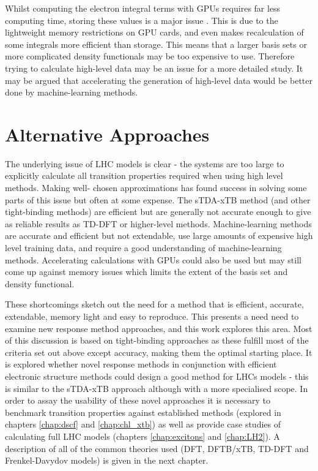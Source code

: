 Whilst computing the electron integral terms with GPUs requires far less computing 
time, storing these values is a major issue \cite{Sisto2014a}. This is due to the
lightweight memory restrictions on GPU cards, and even makes recalculation of some
integrals more efficient than storage. This means that a larger basis sets or more
complicated density functionals may be too expensive to use. Therefore trying to
calculate high-level data may be an issue for a more detailed study. It may be argued
that accelerating the generation of high-level data would be better done by machine-learning
methods.

\section{Alternative Approaches}
\label{sec:possible_novel_methods}

The underlying issue of LHC models is clear - the systems are too large to explicitly
calculate all transition properties required when using high level methods. Making
well- chosen approximations has found success in solving some parts of this issue
but often at some expense. The sTDA-xTB method (and other tight-binding methods) 
are efficient but are generally not accurate enough to give as reliable results 
as TD-DFT or higher-level methods. Machine-learning methods are accurate and efficient
but not extendable, use large amounts of expensive high level training data, and
require a good understanding of machine-learning methods. Accelerating calculations 
with GPUs could also be used but may still come up against memory issues which limits 
the extent of the basis set and density functional.

These shortcomings sketch out the need for a method that is efficient, accurate,
extendable, memory light and easy to reproduce. This presents a need need to examine
new response method approaches, and this work explores this area. Most of this discussion
is based on tight-binding approaches as these fulfill most of the criteria set out
above except accuracy, making them the optimal starting place. It is explored whether
novel response methods in conjunction with efficient electronic structure methods
could design a good method for LHCs models - this is similar to the sTDA-xTB approach
although with a more specialised scope. In order to assay the usability of these
novel approaches it is necessary to benchmark transition properties against established 
methods (explored in chapters \ref{chap:dscf} and \ref{chap:chl_xtb}) as well as
provide case studies of calculating full LHC models (chapters \ref{chap:excitons} 
and \ref{chap:LH2}). A description of all of the common theories used (DFT, DFTB/xTB,
TD-DFT and Frenkel-Davydov models) is given in the next chapter.